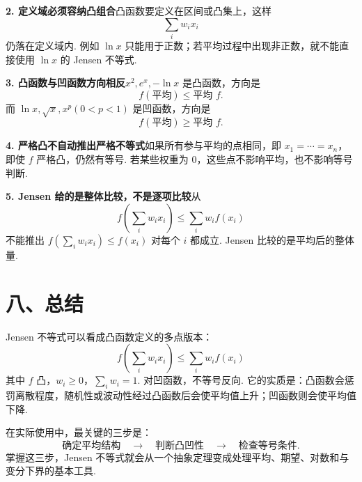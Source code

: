 \documentclass[UTF8, 12pt, fontset=fandol, oneside]{ctexart}
\begin{document}
\noindent\textbf{2. 定义域必须容纳凸组合}\quad 凸函数要定义在区间或凸集上，这样
\[
  \sum_iw_ix_i
\]
仍落在定义域内. 例如 $\ln x$ 只能用于正数；若平均过程中出现非正数，就不能直接使用 $\ln x$ 的 Jensen 不等式.

\noindent\textbf{3. 凸函数与凹函数方向相反}\quad $x^2,e^x,-\ln x$ 是凸函数，方向是
\[
  f(\text{平均})\le \text{平均 }f.
\]
而 $\ln x,\sqrt x,x^p(0<p<1)$ 是凹函数，方向是
\[
  f(\text{平均})\ge \text{平均 }f.
\]

\noindent\textbf{4. 严格凸不自动推出严格不等式}\quad 如果所有参与平均的点相同，即 $x_1=\cdots=x_n$，即使 $f$ 严格凸，仍然有等号. 若某些权重为 $0$，这些点不影响平均，也不影响等号判断.

\noindent\textbf{5. Jensen 给的是整体比较，不是逐项比较}\quad 从
\[
  f\left(\sum_iw_ix_i\right)\le\sum_iw_if(x_i)
\]
不能推出 $f(\sum_iw_ix_i)\le f(x_i)$ 对每个 $i$ 都成立. Jensen 比较的是平均后的整体量.

\section*{八、总结}

Jensen 不等式可以看成凸函数定义的多点版本：
\[
  \boxed{
  f\left(\sum_iw_ix_i\right)\le\sum_iw_if(x_i)
  }
\]
其中 $f$ 凸，$w_i\ge0$，$\sum_iw_i=1$. 对凹函数，不等号反向. 它的实质是：凸函数会惩罚离散程度，随机性或波动性经过凸函数后会使平均值上升；凹函数则会使平均值下降.

在实际使用中，最关键的三步是：
\[
  \text{确定平均结构}\quad\longrightarrow\quad
  \text{判断凸凹性}\quad\longrightarrow\quad
  \text{检查等号条件}.
\]
掌握这三步，Jensen 不等式就会从一个抽象定理变成处理平均、期望、对数和与变分下界的基本工具.
\end{document}

